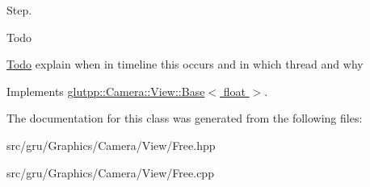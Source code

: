 \-Step. 

\begin{DoxyRefDesc}{\-Todo}
\item[\hyperlink{todo__todo000002}{\-Todo}]explain when in timeline this occurs and in which thread and why \end{DoxyRefDesc}


\-Implements \hyperlink{classglutpp_1_1Camera_1_1View_1_1Base_a92154fdd1ef6a972cf5d38c51aea616a}{glutpp\-::\-Camera\-::\-View\-::\-Base$<$ float $>$}.



\-The documentation for this class was generated from the following files\-:\begin{DoxyCompactItemize}
\item 
src/gru/\-Graphics/\-Camera/\-View/\-Free.\-hpp\item 
src/gru/\-Graphics/\-Camera/\-View/\-Free.\-cpp\end{DoxyCompactItemize}

